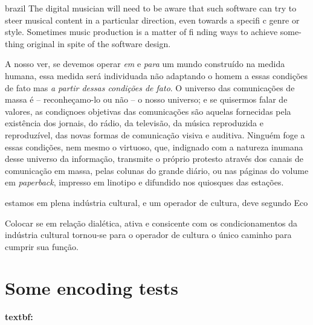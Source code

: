 \begin{otherlanguage*}{brazil}
The digital musician will need to be aware that such software can try to steer musical content in a particular direction, even towards a specifi c genre or style. Sometimes music production is a matter of fi nding ways to achieve some- thing original in spite of the software design. \cite[195]{Hugill2012}


\begin{citacao}
A nosso ver, se devemos operar \emph{em} e \emph{para} um mundo construído na medida humana, essa medida será individuada não adaptando o homem a essas condições de fato mas \emph{a partir dessas condições de fato}. O universo das comunicações de massa é -- reconheçamo-lo ou não -- o nosso universo; e se quisermos falar de valores, as condiçnoes objetivas das comunicações são aquelas fornecidas pela existência dos jornais, do rádio, da televisão, da música reproduzida e reproduzível, das novas formas de comunicação visiva e auditiva. Ninguém foge a essas condições, nem mesmo o virtuoso, que, indignado com a natureza inumana desse universo da informação, transmite o próprio protesto através dos canais de comunicação em massa, pelas colunas do grande diário, ou nas páginas do volume em \emph{paperback}, impresso em linotipo e difundido nos quiosques das estações.\cite[13]{Eco1970}


\end{citacao}

estamos em plena indústria cultural, e um operador de cultura, deve segundo Eco
\begin{citacao}
Colocar se em relação dialética, ativa e consicente com os condicionamentos da indústria cultural tornou-se para o operador de cultura o único caminho para cumprir sua função. \cite[14]{Eco1970}
\end{citacao}


    \newpage

     \emph{}

    \section*[Some encoding tests]{Some encoding tests}

    \sloppy
    \textbf{textbf:  }
    \fussy

\end{otherlanguage*}




